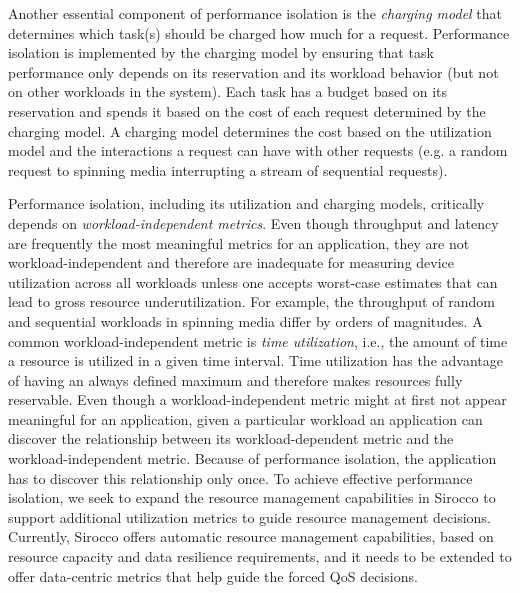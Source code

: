 Another essential component of performance isolation is the \emph{charging
model} that determines which task(s) should be charged how much for a request.
Performance isolation is implemented by the charging model by ensuring that
task performance only depends on its reservation and its workload behavior (but
not on other workloads in the system). Each task has a budget based on its
reservation and spends it based on the cost of each request determined by the
charging model. A charging model determines the cost based on the utilization
model and the interactions a request can have with other requests (e.g. a
random request to spinning media interrupting a stream of sequential requests).

Performance isolation, including its utilization and charging models,
critically depends on \emph{workload-independent metrics}. Even though
throughput and latency are frequently the most meaningful metrics for an
application, they are not workload-independent and therefore are inadequate for
measuring device utilization across all workloads unless one accepts
worst-case estimates that can lead to gross resource underutilization. For
example, the throughput of random and sequential workloads in spinning media
differ by orders of magnitudes. A common workload-independent metric is
\emph{time utilization}, i.e., the amount of time a resource is utilized in a
given time interval. Time utilization has the advantage of having an always
defined maximum and therefore makes resources fully reservable. Even though a
workload-independent metric might at first not appear meaningful for an
application, given a particular workload an application can discover the
relationship between its workload-dependent metric and the workload-independent
metric.  Because of performance isolation, the application has to discover this
relationship only once.  To achieve effective performance isolation, we seek to
expand the resource management capabilities in Sirocco to support additional
utilization metrics to guide resource management decisions. Currently, Sirocco
offers automatic resource management capabilities, based on resource capacity
and data resilience requirements, and it needs to be extended to offer
data-centric metrics that help guide the forced QoS decisions.

